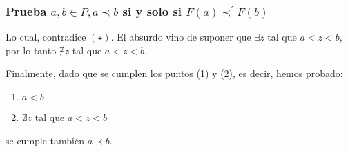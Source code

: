 \begin{frame}
	\frametitle{Prueba $a, b \in P, a \prec b$ si y solo si $F(a) \prec^{\prime} F(b)$}

	\begin{block}{}
		\PN Lo cual, contradice $(\star)$. El absurdo vino de suponer que $\exists z$ tal que $a < z < b$, por lo tanto
		$\nexists z$ tal que $a < z < b$.

		\vspace{5mm}
		\PN Finalmente, dado que se cumplen los puntos (1) y (2), es decir, hemos probado:
		\begin{enumerate}
			\item $a < b$
			\item $\nexists z$ tal que $a < z < b$
		\end{enumerate}

		\vspace{5mm}
		\PN se cumple también $a\prec b$.
	\end{block}
\end{frame}
